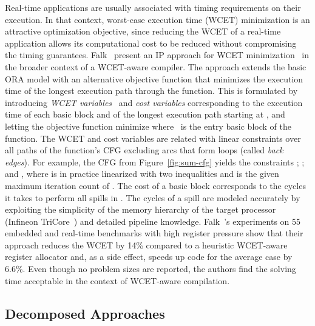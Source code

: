 \documentclass[acmsmall,authorversion,nonacm]{acmart}
\newcommand{\var}[2]{}
\begin{document}
Real-time applications are usually associated with timing requirements
on their execution.
In that context, worst-case execution time (WCET) minimization is an
attractive optimization objective, since reducing the WCET of a
real-time application allows its computational cost to be reduced
without compromising the timing guarantees.
Falk~\etal{} present an IP approach for WCET
minimization~\cite{Falk2011} in the broader context of a WCET-aware
compiler.
The approach extends the basic ORA model with an alternative objective
function that minimizes the execution time of the longest execution
path through the function.
This is formulated by introducing \emph{WCET variables}~\var{w}{b} and
\emph{cost variables} \var{c}{b} corresponding to the execution time
of each basic block  and of the longest execution path starting at
, and letting the objective function minimize \var{w}{b_e}
where~ is the entry basic block of the function.
The WCET and cost variables are related with linear constraints over
all paths of the function's CFG excluding arcs that form loops (called
\emph{back edges}).
For example, the CFG from Figure~\ref{fig:sum-cfg} yields the
constraints ;
; and , where  is in practice linearized with two
inequalities and  is the given maximum iteration count of .
The cost \var{c}{b} of a basic block  corresponds to the cycles it
takes to perform all spills in .
The cycles of a spill are modeled accurately by exploiting the
simplicity of the memory hierarchy of the target processor (Infineon
TriCore~\cite{TriCore}) and detailed pipeline knowledge.
Falk~\etal{}'s experiments on 55 embedded and real-time benchmarks
with high register pressure show that their approach reduces the WCET
by 14\% compared to a heuristic WCET-aware register allocator and, as
a side effect, speeds up code for the average case by 6.6\%.
Even though no problem sizes are reported, the authors find the
solving time acceptable in the context of WCET-aware compilation.

\subsection{Decomposed Approaches}
\label{sec:decomposed-approaches}
\end{document}
